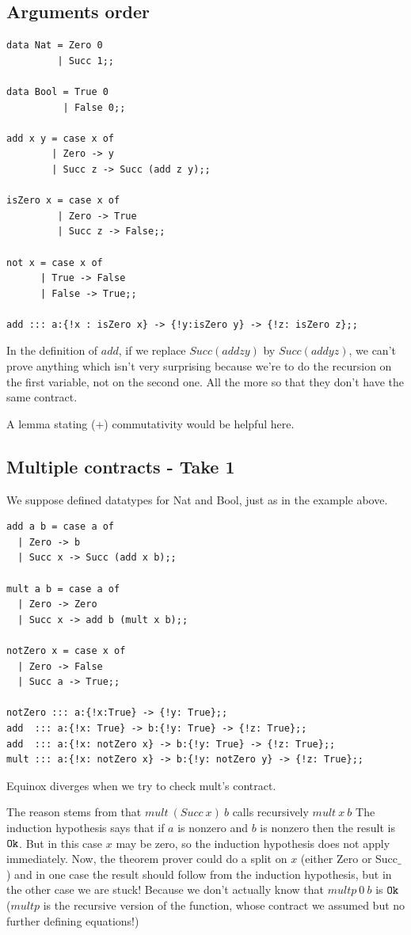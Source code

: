 \documentclass{article}
\begin{document}
\subsection{Arguments order}
\begin{verbatim}
data Nat = Zero 0
         | Succ 1;;

data Bool = True 0
          | False 0;;

add x y = case x of
        | Zero -> y
        | Succ z -> Succ (add z y);;

isZero x = case x of
         | Zero -> True
         | Succ z -> False;;

not x = case x of
      | True -> False
      | False -> True;;

add ::: a:{!x : isZero x} -> {!y:isZero y} -> {!z: isZero z};;
\end{verbatim}

In the definition of $add$, if we replace $Succ (add z y)$ by $Succ (add y z)$, we can't prove anything which isn't very surprising because we're to do the recursion on the first variable, not on the second one. All the more so that they don't have the same contract.

A lemma stating (+) commutativity would be helpful here.


\subsection{Multiple contracts - Take 1}
We suppose defined datatypes for Nat and Bool, just as in the example above.

\begin{verbatim}
add a b = case a of
  | Zero -> b
  | Succ x -> Succ (add x b);;

mult a b = case a of
  | Zero -> Zero
  | Succ x -> add b (mult x b);;

notZero x = case x of
  | Zero -> False
  | Succ a -> True;;

notZero ::: a:{!x:True} -> {!y: True};;
add  ::: a:{!x: True} -> b:{!y: True} -> {!z: True};;
add  ::: a:{!x: notZero x} -> b:{!y: True} -> {!z: True};;
mult ::: a:{!x: notZero x} -> b:{!y: notZero y} -> {!z: True};;
\end{verbatim}

Equinox diverges when we try to check mult's contract.

The reason stems from that $mult~(Succ~x)~b$ calls recursively
$mult~x~b$ The induction hypothesis says that if $a$ is nonzero and
$b$ is nonzero then the result is $\texttt{Ok}$. But in this case $x$ may be
zero, so the induction hypothesis does not apply immediately. Now, the
theorem prover could do a split on $x$ (either Zero or Succ$\_$) and
in one case the result should follow from the induction hypothesis,
but in the other case we are stuck! Because we don't actually know
that $multp~0~b$ is $\texttt{Ok}$ ($multp$ is the recursive version of the
function, whose contract we assumed but no further defining
equations!)
\end{document}
